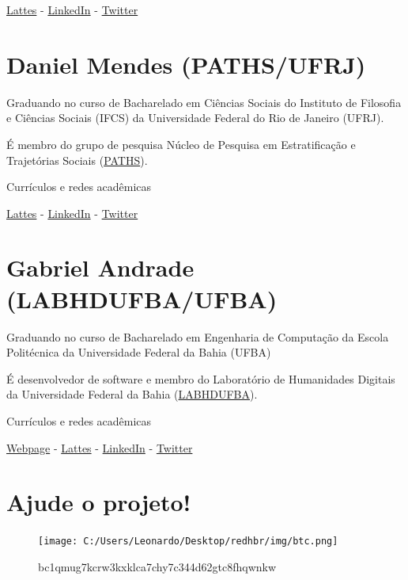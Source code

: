 \documentclass[
]{book}
\begin{document}
\href{http://lattes.cnpq.br/8314700954142455}{Lattes} -
\href{https://www.linkedin.com/in/tarssio-brito-barreto-9646b817b/}{LinkedIn} -
\href{https://twitter.com/danielmnds34}{Twitter}

\hypertarget{daniel-mendes-pathsufrj}{%
\section{Daniel Mendes (PATHS/UFRJ)}\label{daniel-mendes-pathsufrj}}

Graduando no curso de Bacharelado em Ciências Sociais do Instituto de Filosofia e Ciências Sociais (IFCS) da Universidade Federal do Rio de Janeiro (UFRJ).

É membro do grupo de pesquisa Núcleo de Pesquisa em Estratificação e Trajetórias Sociais (\href{https://www.facebook.com/paths.research/}{PATHS}).

Currículos e redes acadêmicas

\href{http://lattes.cnpq.br/9834413442426550}{Lattes} - \href{https://www.linkedin.com/in/daniel-mendes-251212176/}{LinkedIn} - \href{https://twitter.com/danielmnds34}{Twitter}

\hypertarget{gabriel-andrade-labhdufbaufba}{%
\section{Gabriel Andrade (LABHDUFBA/UFBA)}\label{gabriel-andrade-labhdufbaufba}}

Graduando no curso de Bacharelado em Engenharia de Computação da Escola Politécnica da Universidade Federal da Bahia (UFBA)

É desenvolvedor de software e membro do Laboratório de Humanidades Digitais da Universidade Federal da Bahia (\href{http://www.labhd.ufba.br/}{LABHDUFBA}).

Currículos e redes acadêmicas

\href{https://gabrielsandrade.github.io}{Webpage} - \href{http://lattes.cnpq.br/4915378425369073}{Lattes} - \href{https://www.linkedin.com/in/gabriel-andrade-633996108}{LinkedIn} - \href{https://twitter.com/ga_brieell_}{Twitter}

\hypertarget{ajude-o-projeto}{%
\section{Ajude o projeto!}\label{ajude-o-projeto}}

\begin{figure}
\centering
\texttt{[image: C:/Users/Leonardo/Desktop/redhbr/img/btc.png]}
\caption{bc1qmug7kcrw3kxklca7chy7c344d62gtc8fhqwnkw}
\end{figure}

  
\end{document}
